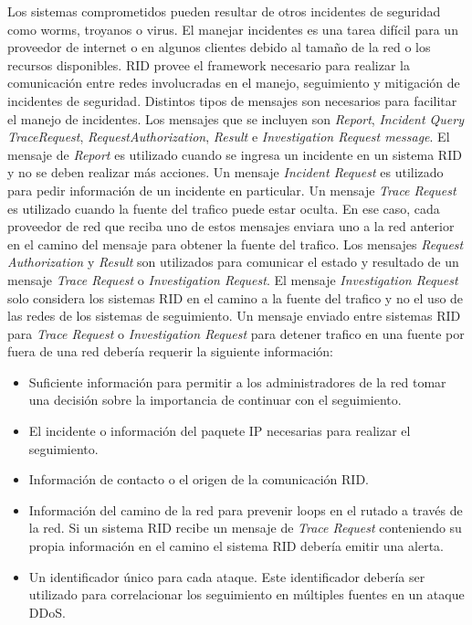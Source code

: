 Los sistemas comprometidos pueden resultar de otros incidentes de seguridad como 
worms, troyanos o virus. %
El manejar 
incidentes es una tarea difícil para un proveedor de internet o en algunos 
clientes debido al tamaño de la red o los recursos disponibles.
RID provee el framework necesario para realizar la comunicación entre redes 
involucradas en el manejo, seguimiento y mitigación de incidentes de seguridad. 
Distintos tipos de mensajes son necesarios para facilitar el manejo de 
incidentes. Los mensajes que se incluyen son \emph{Report}, \emph{Incident Query} 
\emph{TraceRequest}, \emph{RequestAuthorization}, \emph{Result} e 
\emph{Investigation Request message}. El mensaje de \emph{Report} es utilizado 
cuando se ingresa un incidente en un sistema RID y no se deben realizar más 
acciones. Un mensaje \emph{Incident Request} es utilizado para pedir información 
de un incidente en particular. Un mensaje \emph{Trace Request} es utilizado 
cuando la fuente del trafico puede estar oculta. En ese caso, cada proveedor de 
red que reciba uno de estos mensajes enviara uno a la red anterior en el camino 
del mensaje para obtener la fuente del trafico. Los mensajes \emph{Request 
Authorization} y \emph{Result} son utilizados para comunicar el estado y 
resultado de un mensaje \emph{Trace Request} o \emph{Investigation Request}. El 
mensaje \emph{Investigation Request} solo considera los sistemas RID en el 
camino a la fuente del trafico y no el uso de las redes de los sistemas de seguimiento. 
Un mensaje enviado entre sistemas RID para \emph{Trace Request} o 
\emph{Investigation Request} para detener trafico en una fuente por fuera de una 
red debería requerir la siguiente información:
\begin{itemize}
  \item Suficiente información para permitir  a los administradores de la red 
  tomar una decisión sobre la importancia de continuar con el seguimiento.
  \item El incidente o información del paquete IP necesarias para realizar el 
  seguimiento.
  \item Información de contacto o el origen de la comunicación RID. 
  \item Información del camino de la red para prevenir loops en el rutado a 
  través de la red. Si un sistema RID recibe un mensaje de \emph{Trace Request} 
  conteniendo su propia información en el camino el sistema RID debería emitir 
  una alerta.
  \item Un identificador único para cada ataque. Este identificador debería ser 
  utilizado para correlacionar los seguimiento en múltiples fuentes en un 
  ataque DDoS.
\end{itemize}

